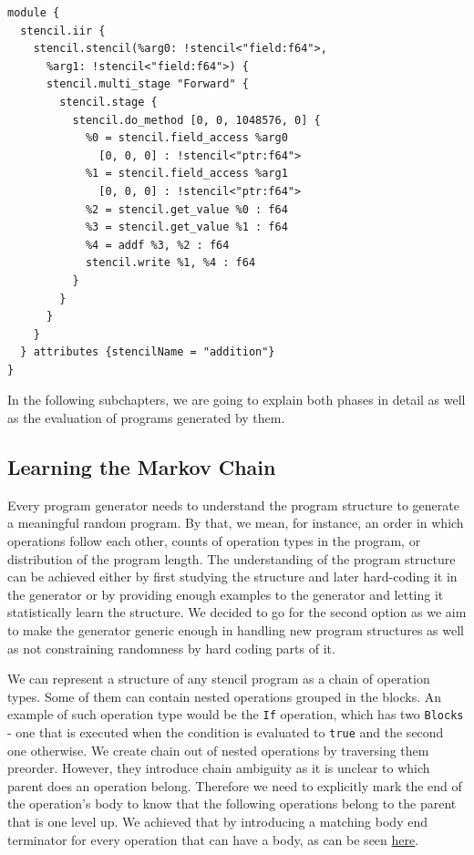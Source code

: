 \documentclass[sigplan,\review anonymous]{acmart}
\begin{document}
\begin{lstlisting}[caption={An example of the program generated 
  from the chain},captionpos=b\label{lst:sample}]
module {
  stencil.iir {
    stencil.stencil(%arg0: !stencil<"field:f64">,
      %arg1: !stencil<"field:f64">) {
      stencil.multi_stage "Forward" {
        stencil.stage {
          stencil.do_method [0, 0, 1048576, 0] {
            %0 = stencil.field_access %arg0
              [0, 0, 0] : !stencil<"ptr:f64">
            %1 = stencil.field_access %arg1
              [0, 0, 0] : !stencil<"ptr:f64">
            %2 = stencil.get_value %0 : f64
            %3 = stencil.get_value %1 : f64
            %4 = addf %3, %2 : f64
            stencil.write %1, %4 : f64
          }
        }
      }
    }
  } attributes {stencilName = "addition"}
}
\end{lstlisting}

In the following subchapters, we are going to explain both phases in detail
as well as the evaluation of programs generated by them.

\subsection{Learning the Markov Chain}
Every program generator needs to understand the program structure to generate
a meaningful random program. By that, we mean, for instance, an order in which
operations follow each other, counts of operation types in the program, or
distribution of the program length. The understanding of the program structure
can be achieved either by first studying the structure and later hard-coding
it in the generator or by providing enough examples to the generator and
letting it statistically learn the structure. We decided to go for the second
option as we aim to make the generator generic enough in handling new program
structures as well as not constraining randomness by hard coding parts of it.

We can represent a structure of any stencil program as a chain of operation
types. Some of them can contain nested operations grouped in the blocks. An
example of such operation type would be the \texttt{If} operation, which has
two \texttt{Blocks} - one that is executed when the condition is evaluated to
\texttt{true} and the second one otherwise. We create chain out of nested
operations by traversing them preorder. However, they introduce chain
ambiguity as it is unclear to which parent does an operation belong. Therefore
we need to explicitly mark the end of the operation's body to know that the
following operations belong to the parent that is one level up. We achieved
that by introducing a matching body end terminator for every operation that
can have a body, as can be seen \hyperref[chain]{here}.
\end{document}

